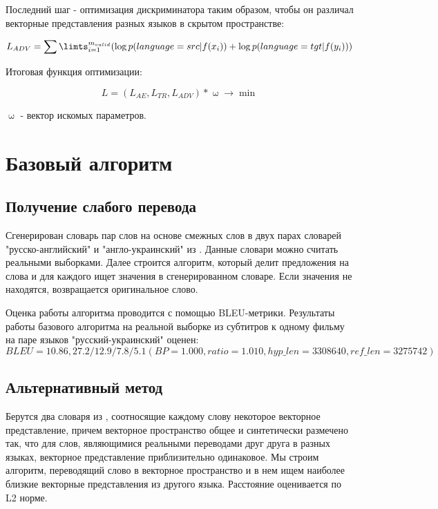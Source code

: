 \documentclass[12pt,twoside]{article}
\begin{document}
Последний шаг - оптимизация дискриминатора таким образом, чтобы он различал векторные представления разных языков в скрытом пространстве:

$$L_{ADV}=\sum\limts_{i=1}^{m_{valid}}(\log p(language=src|f(x_i))+\log p(language=tgt|f(y_i)))$$

Итоговая функция оптимизации:

$$L=(L_{AE},L_{TR},L_{ADV})*\upomega\rightarrow \min$$

$\upomega$ - вектор искомых параметров.

\section{Базовый алгоритм}
\subsection{Получение слабого перевода}
Сгенерирован словарь пар слов на основе смежных слов в двух парах словарей "русско-английский" и "англо-украинский" из \cite{conneau2017word}. Данные словари можно считать реальными выборками. Далее строится алгоритм, который делит предложения на слова и для каждого ищет значения в сгенерированном словаре. Если значения не находятся, возвращается оригинальное слово. 

Оценка работы алгоритма проводится с помощью BLEU-метрики. Результаты работы базового алгоритма на реальной выборке из субтитров к одному фильму на паре языков "русский-украинский" оценен: $$BLEU = 10.86, 27.2/12.9/7.8/5.1 (BP=1.000, ratio=1.010, hyp\_len=3308640, ref\_len=3275742)$$


\subsection{Альтернативный метод}
Берутся два словаря из \cite{conneau2017word}, соотносящие каждому слову некоторое векторное представление, причем векторное пространство общее и синтетически размечено так, что для слов, являющимися реальными переводами друг друга в разных языках, векторное представление приблизительно одинаковое. Мы строим алгоритм, переводящий слово в векторное пространство и в нем ищем наиболее близкие векторные представления из другого языка. Расстояние оценивается по L2 норме.


\end{document}
